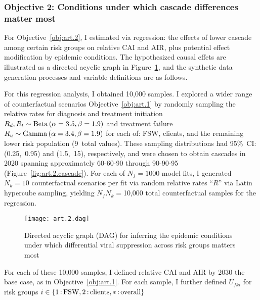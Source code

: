 \subsubsection{Objective 2: Conditions under which cascade differences matter most}\label{art.meth.obj.2}
For Objective~\ref{obj:art.2}, I estimated via regression:
the effects of lower cascade among certain risk groups on relative CAI and AIR,
plus potential effect modification by epidemic conditions.
The hypothesized causal effets are illustrated
as a directed acyclic graph in Figure~\ref{fig:art.2.dag},
and the synthetic data generation processes and variable definitions are as follows.
\par
For this regression analysis, I obtained 10,000 samples.
I explored a wider range of counterfactual scenarios \vs Objective~\ref{obj:art.1}
by randomly sampling the relative rates for
diagnosis and treatment initiation $R_d, R_t \sim \operatorname{Beta}\,(\alpha=3.5,\beta=1.9)$
and treatment failure $R_u \sim \operatorname{Gamma}\,(\alpha=3.4,\beta=1.9)$
for each of: FSW, clients, and the remaining lower risk population (9~total values).
These sampling distributions had 95\%~CI: (0.25,~0.95) and (1.5,~15), respectively,
and were chosen to obtain cascades in 2020 spanning
approximately \mbox{60-60-90} through \mbox{90-90-95} (Figure~\ref{fig:art.2.cascade}). %
For each of $N_f = 1000$ model fits, I generated $N_k = 10$ counterfactual scenarios per fit
via random relative rates ``$R$'' via Latin hypercube sampling,
yielding $N_f N_k = {}$10,000 total counterfactual samples for the regression.
\begin{figure}
  \centering\texttt{[image: art.2.dag]}
  \caption{Directed acyclic graph (DAG) for inferring
    the epidemic conditions under which
    differential viral suppression across risk groups matters most}
  \label{fig:art.2.dag}
\end{figure}
\par
For each of these 10,000 samples, I defined
relative CAI and AIR by 2030 \vs the base case, as in Objective~\ref{obj:art.1}.
For each sample, I further defined
$U_{fki}$ for risk groups $i \in \{1{\,:\,}\textnormal{FSW}, 2{\,:\,}\textnormal{clients}, *{\,:\,}\textnormal{overall}\}$
